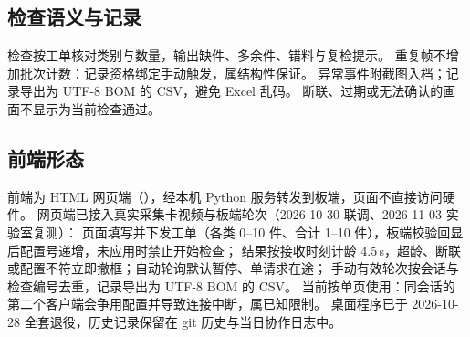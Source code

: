 \subsection{检查语义与记录}
检查按工单核对类别与数量，输出缺件、多余件、错料与复检提示。
重复帧不增加批次计数：记录资格绑定手动触发，属结构性保证。
异常事件附截图入档；记录导出为 UTF-8 BOM 的 CSV，避免 Excel 乱码。
断联、过期或无法确认的画面不显示为当前检查通过。

\subsection{前端形态}
前端为 HTML 网页端（），经本机 Python 服务转发到板端，页面不直接访问硬件。
网页端已接入真实采集卡视频与板端轮次（2026-10-30 联调、2026-11-03 实验室复测）：
页面填写并下发工单（各类 0--10 件、合计 1--10 件），板端校验回显后配置号递增，未应用时禁止开始检查；
结果按接收时刻计龄 4.5\,s，超龄、断联或配置不符立即撤框；自动轮询默认暂停、单请求在途；
手动有效轮次按会话与检查编号去重，记录导出为 UTF-8 BOM 的 CSV。
当前按单页使用：同会话的第二个客户端会争用配置并导致连接中断，属已知限制。
桌面程序已于 2026-10-28 全套退役，历史记录保留在 git 历史与当日协作日志中。
\FloatBarrier

